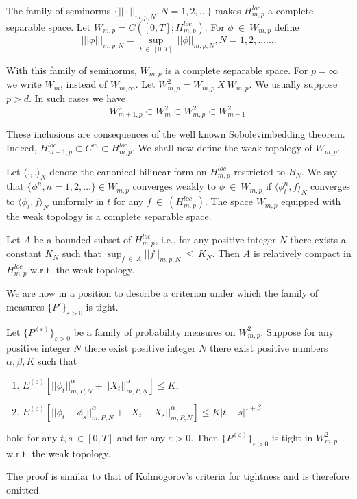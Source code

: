 The family of seminorms $\{ || \cdot ||_{m,p,N}, N = 1,2,\ldots \}$
makes $H^{loc}_{m,p}$ a complete separable space. Let $W_{m,p} =
C([0,T]; H^{loc}_{m,p})$. For $\phi ~ \in ~ W_{m,p}$ define 
$$
||| \phi |||_{m,p,N} = \sup_{t ~ \in ~ [0,T]} ~ || \phi
||_{m,p,N}, N = 1,2,\ldots \ldots.  
$$

With this family of seminorms, $W_{m,p}$ is a complete separable
space. For $p = \infty$ we write $W_m$, instead of $W_{m,\infty}$. Let
$W^2_{m,p} = W_{m,p} ~ X ~ W_{m,p}$. We usually suppose $p > d$. In
such cases we have 
$$
 W^2_{m+1,p} \subset W^2_m \subset W^2_{m,p} \subset
 W^2_{m-1}. 
$$

These inclusions are consequences of the well known Sobolev\break imbedding
theorem. Indeed, $H^{loc}_{m+1,p} \subset C^m \subset
H^{loc}_{m,p}$. We shall now define the weak topology of $W_{m,p}$. 

\setcounter{definition}{5}
\begin{definition}\label{c3:def3.1.6}%
  Let $\langle., . \rangle_N$ denote the canonical bilinear form on
  $H^{loc}_{m,p}$ restricted to $B_N$. We say that $\{ \phi^n, n =
  1,2,\ldots \} \in W_{m,p}$ converges weakly to $\phi ~
  \in ~ W_{m,p}$ if $\langle \phi^n_t, f \rangle_N$ converges
  to $\langle \phi_t,f \rangle_N $ uniformly in $t$ for any $f ~
  \in ~ (H^{loc}_{m,p})$. The space $W_{m,p}$ equipped with
  the weak topology is a complete separable space. 
\end{definition} 

\setcounter{remark}{6}
\begin{remark}\label{c3:rem3.1.7}\pageoriginale%
  Let $A$ be a bounded subset of $H^{loc}_{m,p}$, i.e.,  for any
  positive integer $N$ there exists a constant $K_N$ such that
  $\sup_{f ~\in ~ A} || f ||_{m,p,N} ~ \le ~ K_N$. Then $A$ is
  relatively compact in $H^{loc}_{m,p}$ w.r.t. the weak topology. 
\end{remark}

We are now in a position to describe a criterion under which the
family of measures $\{P^\varepsilon \}_{\varepsilon > 0}$ is tight. 

\setcounter{proposition}{7}
\begin{proposition}\label{c3:prop3.1.8}%
  Let $\{ P^{(\varepsilon)} \}_{\varepsilon > 0}$ be a family of
  probability measures on $W^2_{m,p}$. Suppose for any positive
  integer $N$ there exist positive integer $N$ there exist positive
  numbers $\alpha, \beta, K$ such that 
  \begin{enumerate}[\rm (i)] 
  \item $E^{(\varepsilon)} [ || \phi_t ||^\alpha_{m,P,N} + || X_t
    ||^\alpha_{m,P,N}] \le K$, 
  \item $E^{(\varepsilon)} [ || \phi_t - \phi_s ||^\alpha_{m,P,N} + ||
    X_t - X_s ||^\alpha_{m,P,N}] \le K |t-s |^{1+\beta}$ 
  \end{enumerate}
  hold for any $t,s ~\in [0,T]$ and for any $\varepsilon >
  0$. Then $\{P^{(\varepsilon)} \}_{\varepsilon > 0}$ is tight in
  $W^2_{m,p}$ w.r.t. the weak topology. 
\end{proposition}
The proof is similar to that of Kolmogorov's criteria for tightness
and is therefore omitted. 

